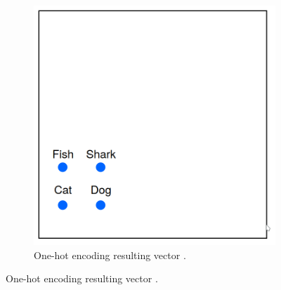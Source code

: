         \begin{figure}[H]
            \centering
            \captionsetup{justification=centering}
          
            \begin{subfigure}{0.32\textwidth}
            \includegraphics[width=\textwidth]{Sections/3StateOfTheArt/3_images/one_hot_ex.png} 
            \caption{One-hot encoding resulting vector \cite{word2vec_explained}. }
          

\end{subfigure}
\end{figure}

